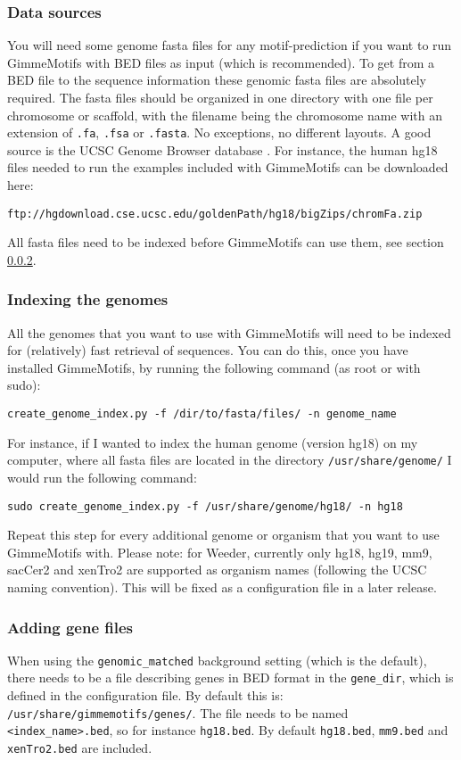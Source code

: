 \documentclass[11pt]{article}
\begin{document}
\subsubsection{Data sources}
You will need some genome fasta files for any motif-prediction if you want to run GimmeMotifs with BED files as input (which is recommended). To get from a BED file to the sequence information these genomic fasta files are absolutely required. The fasta files should be organized in one directory with one file per chromosome or scaffold, with the filename being the chromosome name with an extension of \texttt{.fa}, \texttt{.fsa} or \texttt{.fasta}. No exceptions, no different layouts. A good source is the UCSC Genome Browser database \cite{rhead_ucsc_2010}. For instance, the human hg18 files needed to run the examples included with GimmeMotifs can be downloaded here:
\begin{verbatim}
ftp://hgdownload.cse.ucsc.edu/goldenPath/hg18/bigZips/chromFa.zip
 \end{verbatim}
All fasta files need to be indexed before GimmeMotifs can use them, see section \ref{sec:indexing}.

\subsubsection{Indexing the genomes}
\label{sec:indexing}
All the genomes that you want to use with GimmeMotifs will need to be indexed for (relatively) fast retrieval of sequences. You can do this, once you have installed GimmeMotifs, by running the following command (as root or with sudo):
\begin{verbatim}
create_genome_index.py -f /dir/to/fasta/files/ -n genome_name
\end{verbatim}
For instance, if I wanted to index the human genome (version hg18) on my computer, where all fasta files are located in the directory \texttt{/usr/share/genome/} I would run the following command:
\begin{verbatim}
sudo create_genome_index.py -f /usr/share/genome/hg18/ -n hg18
\end{verbatim}
Repeat this step for every additional genome or organism that you want to use GimmeMotifs with. Please note: for Weeder, currently only hg18, hg19, mm9, sacCer2 and xenTro2 are supported as organism names (following the UCSC naming convention). This will be fixed as a configuration file in a later release.

\subsubsection{Adding gene files}
When using the \texttt{genomic\_matched} background setting (which is the default), there needs to be a file describing genes in BED format in the \texttt{gene\_dir}, which is defined in the configuration file. By default this is: \texttt{/usr/share/gimmemotifs/genes/}. The file needs to be named \texttt{<index\_name>.bed}, so for instance \texttt{hg18.bed}. By default \texttt{hg18.bed}, \texttt{mm9.bed} and \texttt{xenTro2.bed} are included.
\end{document}
